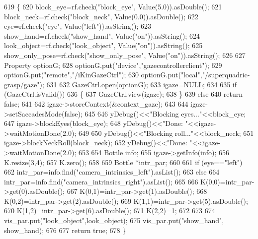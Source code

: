 \begin{DoxyCode}
619 \{
620     block\_eye=rf.check(\textcolor{stringliteral}{"block\_eye"}, Value(5.0)).asDouble();
621     block\_neck=rf.check(\textcolor{stringliteral}{"block\_neck"}, Value(0.0)).asDouble();
622     eye=rf.check(\textcolor{stringliteral}{"eye"}, Value(\textcolor{stringliteral}{"left"})).asString();
623     show\_hand=rf.check(\textcolor{stringliteral}{"show\_hand"}, Value(\textcolor{stringliteral}{"on"})).asString();
624     look\_object=rf.check(\textcolor{stringliteral}{"look\_object"}, Value(\textcolor{stringliteral}{"on"})).asString();
625     show\_only\_pose=rf.check(\textcolor{stringliteral}{"show\_only\_pose"}, Value(\textcolor{stringliteral}{"on"})).asString();
626 
627     Property optionG;
628     optionG.put(\textcolor{stringliteral}{"device"},\textcolor{stringliteral}{"gazecontrollerclient"});
629     optionG.put(\textcolor{stringliteral}{"remote"},\textcolor{stringliteral}{"/iKinGazeCtrl"});
630     optionG.put(\textcolor{stringliteral}{"local"},\textcolor{stringliteral}{"/superquadric-grasp/gaze"});
631 
632     GazeCtrl.open(optionG);
633     igaze=NULL;
634 
635     \textcolor{keywordflow}{if} (GazeCtrl.isValid())
636     \{
637         GazeCtrl.view(igaze);
638     \}
639     \textcolor{keywordflow}{else}
640         \textcolor{keywordflow}{return} \textcolor{keyword}{false};
641 
642     igaze->storeContext(&context\_gaze);
643 
644     igaze->setSaccadesMode(\textcolor{keyword}{false});
645 
646     yDebug()<<\textcolor{stringliteral}{"Blocking eyes..."}<<block\_eye;
647     igaze->blockEyes(block\_eye);
648     yDebug()<<\textcolor{stringliteral}{"Done: "}<<igaze->waitMotionDone(2.0);
649 
650     yDebug()<<\textcolor{stringliteral}{"Blocking roll..."}<<block\_neck;
651     igaze->blockNeckRoll(block\_neck);
652     yDebug()<<\textcolor{stringliteral}{"Done: "}<<igaze->waitMotionDone(2.0);
653 
654     Bottle info;
655     igaze->getInfo(info);
656     K.resize(3,4);
657     K.zero();
658 
659     Bottle *intr\_par;
660 
661     \textcolor{keywordflow}{if} (eye==\textcolor{stringliteral}{"left"})
662         intr\_par=info.find(\textcolor{stringliteral}{"camera\_intrinsics\_left"}).asList();
663     \textcolor{keywordflow}{else}
664         intr\_par=info.find(\textcolor{stringliteral}{"camera\_intrinsics\_right"}).asList();
665 
666     K(0,0)=intr\_par->get(0).asDouble();
667     K(0,1)=intr\_par->get(1).asDouble();
668     K(0,2)=intr\_par->get(2).asDouble();
669     K(1,1)=intr\_par->get(5).asDouble();
670     K(1,2)=intr\_par->get(6).asDouble();
671     K(2,2)=1;
672 
673 
674     vis\_par.put(\textcolor{stringliteral}{"look\_object"},look\_object);
675     vis\_par.put(\textcolor{stringliteral}{"show\_hand"}, show\_hand);
676 
677     \textcolor{keywordflow}{return} \textcolor{keyword}{true};
678 \}
\end{DoxyCode}
